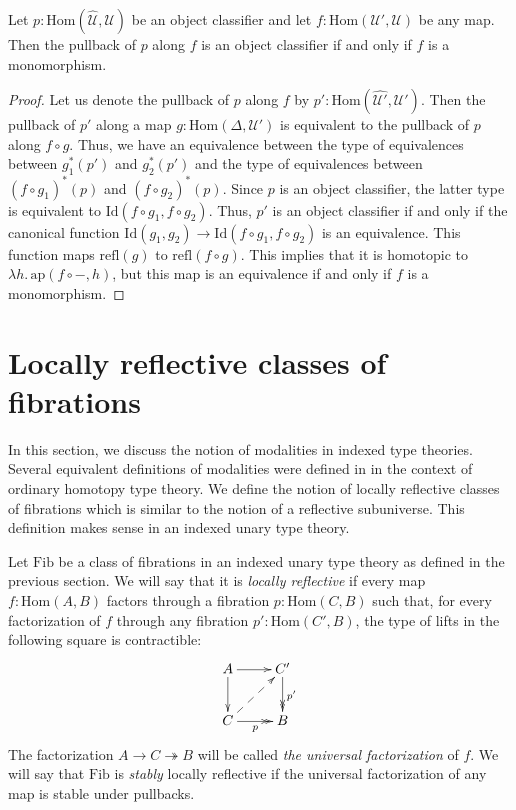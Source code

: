 \documentclass[reqno]{mscs}
\newcommand{\fs}[1]{\mathrm{#1}}
\newcommand{\Hom}{\fs{Hom}}
\newcommand{\Id}{\fs{Id}}
\newcommand{\refl}{\fs{refl}}
\newcommand{\pmap}{\fs{ap}}
\newcommand{\Fib}{\fs{Fib}}
\numberwithin{figure}{section}
\begin{document}
\begin{prop}
Let $p : \Hom(\widehat{\mathcal{U}},\mathcal{U})$ be an object classifier and let $f : \Hom(\mathcal{U}',\mathcal{U})$ be any map.
Then the pullback of $p$ along $f$ is an object classifier if and only if $f$ is a monomorphism.
\end{prop}
\begin{proof}
Let us denote the pullback of $p$ along $f$ by $p' : \Hom(\widehat{\mathcal{U}'},\mathcal{U}')$.
Then the pullback of $p'$ along a map $g : \Hom(\Delta,\mathcal{U}')$ is equivalent to the pullback of $p$ along $f \circ g$.
Thus, we have an equivalence between the type of equivalences between $g_1^*(p')$ and $g_2^*(p')$ and the type of equivalences between $(f \circ g_1)^*(p)$ and $(f \circ g_2)^*(p)$.
Since $p$ is an object classifier, the latter type is equivalent to $\Id(f \circ g_1, f \circ g_2)$.
Thus, $p'$ is an object classifier if and only if the canonical function $\Id(g_1,g_2) \to \Id(f \circ g_1, f \circ g_2)$ is an equivalence.
This function maps $\refl(g)$ to $\refl(f \circ g)$.
This implies that it is homotopic to $\lambda h.\,\pmap(f \circ -, h)$, but this map is an equivalence if and only if $f$ is a monomorphism.
\end{proof}

\section{Locally reflective classes of fibrations}
\label{sec:refl-fib}

In this section, we discuss the notion of modalities in indexed type theories.
Several equivalent definitions of modalities were defined in \cite{modality-hott} in the context of ordinary homotopy type theory.
We define the notion of locally reflective classes of fibrations which is similar to the notion of a reflective subuniverse.
This definition makes sense in an indexed unary type theory.

Let $\Fib$ be a class of fibrations in an indexed unary type theory as defined in the previous section.
We will say that it is \emph{locally reflective} if every map $f : \Hom(A,B)$ factors through a fibration $p : \Hom(C,B)$
such that, for every factorization of $f$ through any fibration $p' : \Hom(C',B)$, the type of lifts in the following square is contractible:
\[ \xymatrix{ A \ar[r] \ar[d]                   & C' \ar@{->>}[d]^{p'} \\
              C \ar@{->>}[r]_p \ar@{-->}[ur]    & B
            } \]
The factorization $A \to C \twoheadrightarrow B$ will be called \emph{the universal factorization} of $f$.
We will say that $\Fib$ is \emph{stably} locally reflective if the universal factorization of any map is stable under pullbacks.
\end{document}
